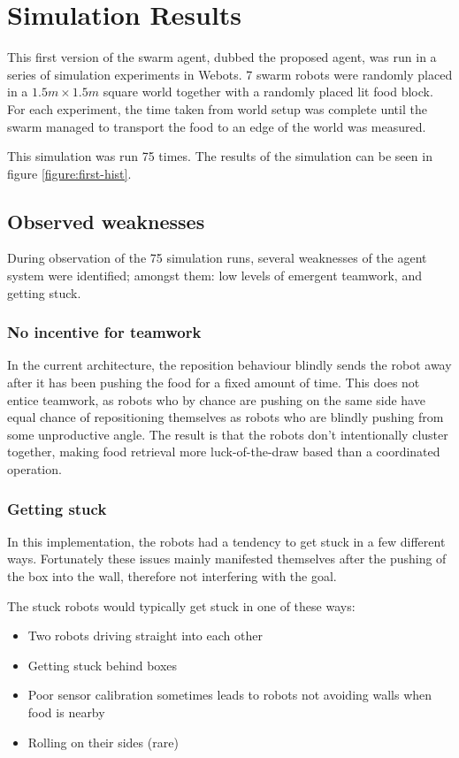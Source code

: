 \documentclass[a4paper]{article}
\begin{document}
\section{Simulation Results}
\label{section:first-sim-results}

This first version of the swarm agent, dubbed the proposed agent, was run in a series of simulation experiments in Webots.
7 swarm robots were randomly placed in a $ 1.5m \times 1.5m $ square world together with a randomly placed lit food block.
For each experiment, the time taken from world setup was complete until the swarm managed to transport the food to an edge of the world was measured.

This simulation was run 75 times.
The results of the simulation can be seen in figure \vref{figure:first-hist}.

\subsection{Observed weaknesses}

During observation of the 75 simulation runs, several weaknesses of the agent system were identified; amongst them: low levels of emergent teamwork, and getting stuck.

\subsubsection{No incentive for teamwork}
In the current architecture, the reposition behaviour blindly sends the robot away after it has been pushing the food for a fixed amount of time.
This does not entice teamwork, as robots who by chance are pushing on the same side have equal chance of repositioning themselves as robots who are blindly pushing from some unproductive angle.
The result is that the robots don't intentionally cluster together, making food retrieval more luck-of-the-draw based than a coordinated operation.

\subsubsection{Getting stuck}
In this implementation, the robots had a tendency to get stuck in a few different ways. Fortunately these issues mainly manifested themselves after the pushing of the box into the wall, therefore not interfering with the goal.

The stuck robots would typically get stuck in one of these ways:

\begin{itemize}
	\item Two robots driving straight into each other
	\item Getting stuck behind boxes
	\item Poor sensor calibration sometimes leads to robots not avoiding walls when food is nearby
    \item Rolling on their sides (rare)
\end{itemize}
\end{document}
